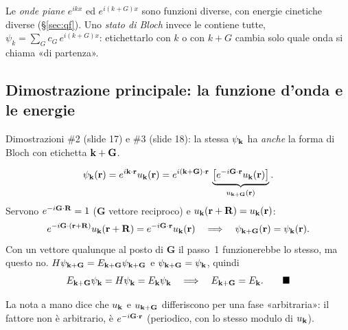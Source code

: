 \documentclass[11pt,a4paper]{article}
\begin{document}
\begin{osservazione}
Le \emph{onde piane} $e^{ikx}$ ed $e^{i(k+G)x}$ sono funzioni diverse, con energie cinetiche diverse (§\ref{sec:qf}). Uno \emph{stato di Bloch} invece le
contiene tutte, $\psi_k=\sum_Gc_G\,e^{i(k+G)x}$: etichettarlo con $k$ o con $k+G$ cambia solo quale onda si chiama «di partenza».
\end{osservazione}

\subsection{Dimostrazione principale: la funzione d'onda e le energie}
Dimostrazioni \#2 (slide 17) e \#3 (slide 18): la stessa $\psi_{\mathbf k}$ ha \emph{anche} la forma di Bloch con etichetta $\mathbf k+\mathbf G$.
\begin{dimostrazione}[$\psi_{\vk+\mathbf G}=\psi_{\vk}$ ed $E_{\vk+\mathbf G}=E_{\vk}$]
\[
\psi_{\mathbf k}(\mathbf r)=e^{i\mathbf k\cdot\mathbf r}u_{\mathbf k}(\mathbf r)=e^{i(\mathbf k+\mathbf G)\cdot\mathbf r}\,
\underbrace{\bigl[e^{-i\mathbf G\cdot\mathbf r}u_{\mathbf k}(\mathbf r)\bigr]}_{u_{\mathbf k+\mathbf G}(\mathbf r)}.
\]
Servono $e^{-i\mathbf G\cdot\mathbf R}=1$ ($\mathbf G$ vettore reciproco) e $u_{\mathbf k}(\mathbf r+\mathbf R)=u_{\mathbf k}(\mathbf r)$:
\[
e^{-i\mathbf G\cdot(\mathbf r+\mathbf R)}u_{\mathbf k}(\mathbf r+\mathbf R)=e^{-i\mathbf G\cdot\mathbf r}u_{\mathbf k}(\mathbf r)\quad\Longrightarrow\quad\psi_{\mathbf k+\mathbf G}(\mathbf r)=\psi_{\mathbf k}(\mathbf r).
\]
Con un vettore qualunque al posto di $\mathbf G$ il passo~1 funzionerebbe lo stesso, ma questo no.
$H\psi_{\mathbf k+\mathbf G}=E_{\mathbf k+\mathbf G}\psi_{\mathbf k+\mathbf G}$ e $\psi_{\vk+\mathbf G}=\psi_{\vk}$, quindi
\[
E_{\vk+\mathbf G}\psi_{\vk}=H\psi_{\vk}=E_{\vk}\psi_{\vk}\quad\Longrightarrow\quad E_{\vk+\mathbf G}=E_{\vk}.\qed
\]
\end{dimostrazione}

\begin{osservazione}
La nota a mano dice che $u_{\mathbf k}$ e $u_{\mathbf k+\mathbf G}$ differiscono per una fase «arbitraria»: il fattore non è arbitrario, è $e^{-i\mathbf G\cdot\mathbf r}$
(periodico, con lo stesso modulo di $u_{\mathbf k}$).
\end{osservazione}
\end{document}
